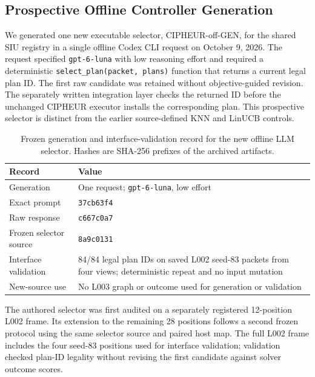 \subsection{Prospective Offline Controller Generation}

We generated one new executable selector, CIPHEUR-off-GEN, for the
shared SIU registry in a single offline Codex CLI request on October 9,
2026. The request specified
\texttt{gpt-6-luna} with low reasoning effort and required a deterministic
\texttt{select\_plan(packet, plans)} function that returns a current legal plan
ID. The first raw candidate was retained without objective-guided revision.
The separately written integration layer checks the returned ID before the
unchanged CIPHEUR executor installs the corresponding plan. This prospective
selector is distinct from the earlier source-defined KNN and LinUCB controls.

\begin{table}[t]
\centering
\small
\caption{Frozen generation and interface-validation record for the new offline LLM selector. Hashes are SHA-256 prefixes of the archived artifacts.}
\label{tab:offline-generation}
\begin{tabular}{@{}lp{}@{}}
\toprule
Record & Value \\
\midrule
Generation & One request; \texttt{gpt-6-luna}, low effort \\
Exact prompt & \texttt{37cb63f4} \\
Raw response & \texttt{c667c0a7} \\
Frozen selector source & \texttt{8a9c0131} \\
Interface validation & 84/84 legal plan IDs on saved L002 seed-83 packets from four views; deterministic repeat and no input mutation \\
New-source use & No L003 graph or outcome used for generation or validation \\
\bottomrule
\end{tabular}
\end{table}

The authored selector was first audited on a separately registered
12-position L002 frame. Its extension to the remaining 28 positions follows
a second frozen protocol using the same selector source and paired host map.
The full L002 frame includes the four seed-83 positions used for interface
validation; validation checked plan-ID legality without revising the first
candidate against solver outcome scores.
